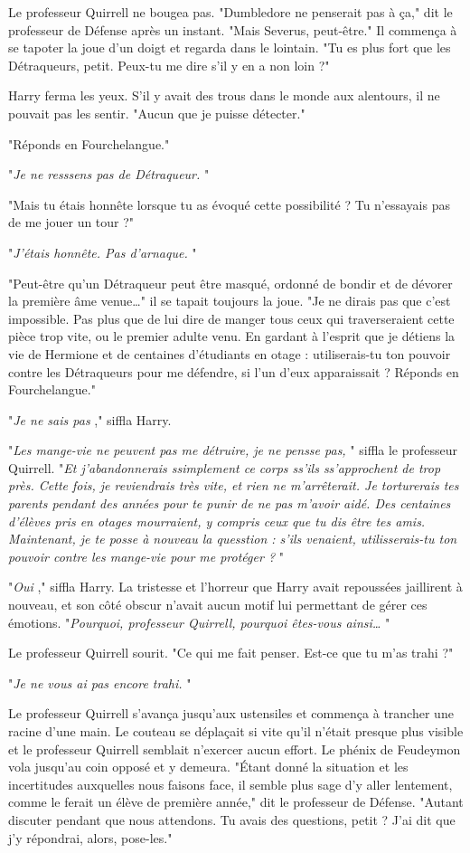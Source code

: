 Le professeur Quirrell ne bougea pas. "Dumbledore ne penserait pas à ça," dit le professeur de Défense après un instant. "Mais Severus, peut-être." Il commença à se tapoter la joue d'un doigt et regarda dans le lointain. "Tu es plus fort que les Détraqueurs, petit. Peux-tu me dire s'il y en a non loin ?"

Harry ferma les yeux. S'il y avait des trous dans le monde aux alentours, il ne pouvait pas les sentir. "Aucun que je puisse détecter."

"Réponds en Fourchelangue."

"\emph{Je ne resssens pas de Détraqueur.} "

"Mais tu étais honnête lorsque tu as évoqué cette possibilité ? Tu n'essayais pas de me jouer un tour ?"

"\emph{J'étais honnête. Pas d'arnaque.} "

"Peut-être qu'un Détraqueur peut être masqué, ordonné de bondir et de dévorer la première âme venue…" il se tapait toujours la joue. "Je ne dirais pas que c'est impossible. Pas plus que de lui dire de manger tous ceux qui traverseraient cette pièce trop vite, ou le premier adulte venu. En gardant à l'esprit que je détiens la vie de Hermione et de centaines d'étudiants en otage : utiliserais-tu ton pouvoir contre les Détraqueurs pour me défendre, si l'un d'eux apparaissait ? Réponds en Fourchelangue."

"\emph{Je ne sais pas} ," siffla Harry.

"\emph{Les mange-vie ne peuvent pas me détruire, je ne pensse pas,} " siffla le professeur Quirrell. "\emph{Et j'abandonnerais ssimplement ce corps ss'ils ss'approchent de trop près. Cette fois, je reviendrais très vite, et rien ne m'arrêterait. Je torturerais tes parents pendant des années pour te punir de ne pas m'avoir aidé. Des centaines d'élèves pris en otages mourraient, y compris ceux que tu dis être tes amis. Maintenant, je te posse à nouveau la quesstion : s'ils venaient, utilisserais-tu ton pouvoir contre les mange-vie pour me protéger ?} "

"\emph{Oui} ," siffla Harry. La tristesse et l'horreur que Harry avait repoussées jaillirent à nouveau, et son côté obscur n'avait aucun motif lui permettant de gérer ces émotions. "\emph{Pourquoi, professeur Quirrell, pourquoi êtes-vous ainsi…} "

Le professeur Quirrell sourit. "Ce qui me fait penser. Est-ce que tu m'as trahi ?"

"\emph{Je ne vous ai pas encore trahi.} "

Le professeur Quirrell s'avança jusqu'aux ustensiles et commença à trancher une racine d'une main. Le couteau se déplaçait si vite qu'il n'était presque plus visible et le professeur Quirrell semblait n'exercer aucun effort. Le phénix de Feudeymon vola jusqu'au coin opposé et y demeura. "Étant donné la situation et les incertitudes auxquelles nous faisons face, il semble plus sage d'y aller lentement, comme le ferait un élève de première année," dit le professeur de Défense. "Autant discuter pendant que nous attendons. Tu avais des questions, petit ? J'ai dit que j'y répondrai, alors, pose-les."

